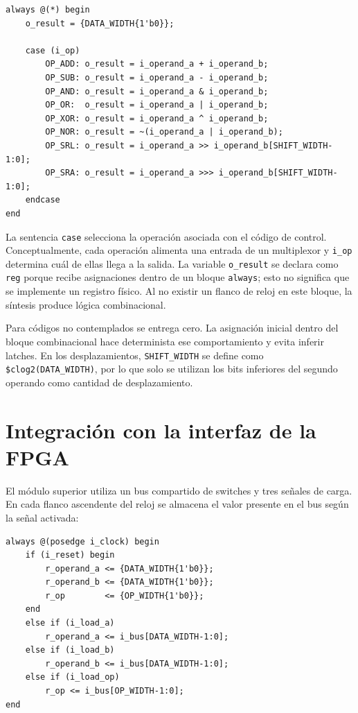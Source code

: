 \documentclass[11pt,a4paper]{article}
\newcommand{\verilog}[1]{\texttt{#1}}
\begin{document}
\begin{lstlisting}[caption={Selección combinacional de operaciones},label={lst:logic}]
always @(*) begin
    o_result = {DATA_WIDTH{1'b0}};

    case (i_op)
        OP_ADD: o_result = i_operand_a + i_operand_b;
        OP_SUB: o_result = i_operand_a - i_operand_b;
        OP_AND: o_result = i_operand_a & i_operand_b;
        OP_OR:  o_result = i_operand_a | i_operand_b;
        OP_XOR: o_result = i_operand_a ^ i_operand_b;
        OP_NOR: o_result = ~(i_operand_a | i_operand_b);
        OP_SRL: o_result = i_operand_a >> i_operand_b[SHIFT_WIDTH-1:0];
        OP_SRA: o_result = i_operand_a >>> i_operand_b[SHIFT_WIDTH-1:0];
    endcase
end
\end{lstlisting}

La sentencia \verilog{case} selecciona la operación asociada con el código de
control. Conceptualmente, cada operación alimenta una entrada de un
multiplexor y \verilog{i\_op} determina cuál de ellas llega a la salida. La
variable \verilog{o\_result} se declara como \verilog{reg} porque recibe
asignaciones dentro de un bloque \verilog{always}; esto no significa que se
implemente un registro físico. Al no existir un flanco de reloj en este bloque,
la síntesis produce lógica combinacional.

Para códigos no contemplados se entrega cero. La asignación inicial dentro del
bloque combinacional hace determinista ese comportamiento y evita inferir
latches. En los desplazamientos, \verilog{SHIFT\_WIDTH} se define como
\verilog{\$clog2(DATA\_WIDTH)}, por lo que solo se utilizan los bits inferiores
del segundo operando como cantidad de desplazamiento.

\section{Integración con la interfaz de la FPGA}

El módulo superior utiliza un bus compartido de switches y tres señales de
carga. En cada flanco ascendente del reloj se almacena el valor presente en el
bus según la señal activada:

\begin{lstlisting}[caption={Carga de entradas en el módulo superior},label={lst:top}]
always @(posedge i_clock) begin
    if (i_reset) begin
        r_operand_a <= {DATA_WIDTH{1'b0}};
        r_operand_b <= {DATA_WIDTH{1'b0}};
        r_op        <= {OP_WIDTH{1'b0}};
    end
    else if (i_load_a)
        r_operand_a <= i_bus[DATA_WIDTH-1:0];
    else if (i_load_b)
        r_operand_b <= i_bus[DATA_WIDTH-1:0];
    else if (i_load_op)
        r_op <= i_bus[OP_WIDTH-1:0];
end
\end{lstlisting}
\end{document}

